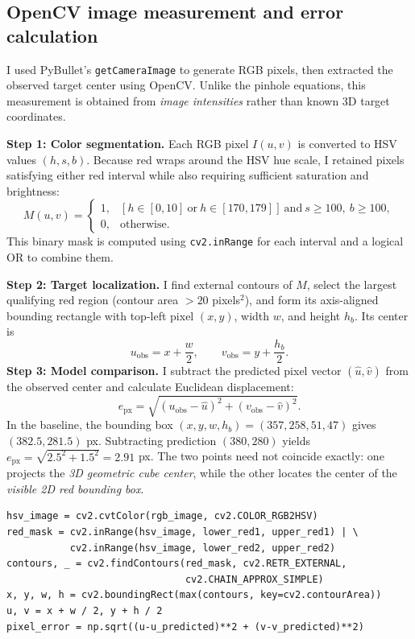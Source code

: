 \documentclass[11pt,letterpaper]{article}
\begin{document}
\subsection{OpenCV image measurement and error calculation}
I used PyBullet's \texttt{getCameraImage} to generate RGB pixels, then extracted the observed target center using OpenCV. Unlike the pinhole equations, this measurement is obtained from \emph{image intensities} rather than known 3D target coordinates.

\textbf{Step 1: Color segmentation.} Each RGB pixel $I(u,v)$ is converted to HSV values $(h,s,b)$. Because red wraps around the HSV hue scale, I retained pixels satisfying either red interval while also requiring sufficient saturation and brightness:
\begin{equation}
M(u,v)=\begin{cases}
1,& [h\in[0,10]\ \mathrm{or}\ h\in[170,179]]\ \mathrm{and}\ s\ge100,\ b\ge100,\\
0,&\text{otherwise.}
\end{cases}\label{eq:mask}
\end{equation}
This binary mask is computed using \texttt{cv2.inRange} for each interval and a logical OR to combine them.

\textbf{Step 2: Target localization.} I find external contours of $M$, select the largest qualifying red region (contour area $>20$ pixels$^2$), and form its axis-aligned bounding rectangle with top-left pixel $(x,y)$, width $w$, and height $h_b$. Its center is
\begin{equation}
\boxed{u_{\mathrm{obs}}=x+\frac{w}{2},\qquad
v_{\mathrm{obs}}=y+\frac{h_b}{2}.}\label{eq:opencv}
\end{equation}
\textbf{Step 3: Model comparison.} I subtract the predicted pixel vector $(\hat u,\hat v)$ from the observed center and calculate Euclidean displacement:
\begin{equation}
\boxed{e_{\mathrm{px}}=\sqrt{(u_{\mathrm{obs}}-\hat u)^2+
(v_{\mathrm{obs}}-\hat v)^2}.}\label{eq:error}
\end{equation}
In the baseline, the bounding box $(x,y,w,h_b)=(357,258,51,47)$ gives $(382.5,281.5)$ px. Subtracting prediction $(380,280)$ yields $e_{\mathrm{px}}=\sqrt{2.5^2+1.5^2}=2.91$ px. The two points need not coincide exactly: one projects the \emph{3D geometric cube center}, while the other locates the center of the \emph{visible 2D red bounding box}.
\begin{lstlisting}[caption={HSV mask, contour detection, and image measurement.},label={lst:opencv}]
hsv_image = cv2.cvtColor(rgb_image, cv2.COLOR_RGB2HSV)
red_mask = cv2.inRange(hsv_image, lower_red1, upper_red1) | \
           cv2.inRange(hsv_image, lower_red2, upper_red2)
contours, _ = cv2.findContours(red_mask, cv2.RETR_EXTERNAL,
                               cv2.CHAIN_APPROX_SIMPLE)
x, y, w, h = cv2.boundingRect(max(contours, key=cv2.contourArea))
u, v = x + w / 2, y + h / 2
pixel_error = np.sqrt((u-u_predicted)**2 + (v-v_predicted)**2)
\end{lstlisting}
\end{document}
